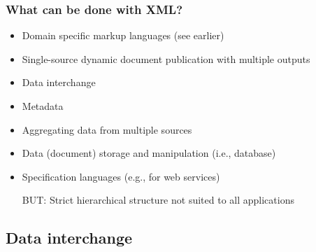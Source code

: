 \frame
{
	\frametitle{What can be done with XML?}
	
	\begin{itemize}
	
		\item Domain specific markup languages (see earlier)

		\item Single-source dynamic document publication with multiple
		outputs
		

		\item Data interchange
		
		
		\item Metadata

		\item Aggregating data from multiple sources

		\item Data (document) storage and manipulation (i.e., database)
		
		\item Specification languages (e.g., for web services)
		
		\item[\alert{BUT:}] Strict hierarchical structure not suited to
		all applications

	\end{itemize}
}





\subsection*{Data interchange}




